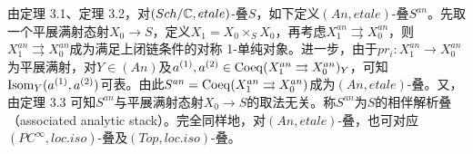 由定理 3.1、定理 3.2，对$(Sch/\mathbb{C},etale)$-叠$S$，如下定义$(An,etale)$-叠$S^{an}$。先取一个平展满射态射$X_0\to S$，定义$X_1=X_0\times_SX_0$，再考虑$X_1^{an}\rightrightarrows X_0^{an}$，则$X_1^{an}\rightrightarrows X_0^{an}$成为满足上闭链条件的对称 1-单纯对象。进一步，由于$pr_i:X_1^{an}\to X_0^{an}$为平展满射，对$Y\in(An)$及$a^{(1)},a^{(2)}\in\operatorname{Coeq}(X_1^{an}\rightrightarrows X_0^{an})_Y$，可知$\operatorname{Isom}_Y(a^{(1)},a^{(2)})$可表。由此$S^{an}=\operatorname{Coeq}(X_1^{an}\rightrightarrows X_0^{an})$成为$(An,etale)$-叠。又，由定理 3.3 可知$S^{an}$与平展满射态射$X_0\to S$的取法无关。称$S^{an}$为$S$的相伴解析叠（associated analytic stack）。完全同样地，对$(An,etale)$-叠，也可对应$(PC^\infty,loc.iso)$-叠及$(Top,loc.iso)$-叠。
